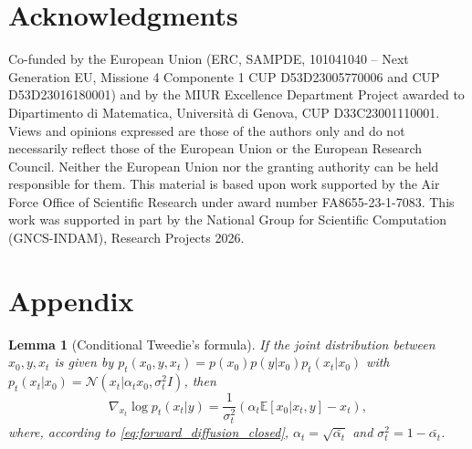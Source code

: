 \documentclass[a4paper,11pt]{article}
\theoremstyle{definition}
\theoremstyle{plain}
\newtheorem{lemma}{Lemma}
\theoremstyle{remark}
\begin{document}
\section*{Acknowledgments}
Co-funded by the European Union (ERC, SAMPDE, 101041040 – Next Generation EU, Missione 4 Componente 1 CUP D53D23005770006 and CUP D53D23016180001) and by the MIUR Excellence Department Project awarded to Dipartimento di Matematica, Università di Genova, CUP D33C23001110001. Views and opinions expressed are  those of the authors only and do not necessarily reflect those of the European Union or the European Research Council. Neither the European Union nor the granting authority can be held responsible for them. This material is based upon work supported by the Air Force Office of Scientific Research under award number FA8655-23-1-7083.
This work was supported in part by the National Group for Scientific Computation (GNCS-INDAM), Research Projects 2026.

\appendix

\section{Appendix}
\label{appendix}
	\begin{lemma}[Conditional Tweedie's formula]
		If the joint distribution between $x_0, y, x_t$ is given by $p_t(x_0, y, x_t) = p(x_0)p(y|x_0)p_t(x_t|x_0)$ with $p_t(x_t|x_0) = \mathcal{N}(x_t| \alpha_t x_0,  \sigma_t^2 I)$, then 
		\begin{equation}
			\nabla_{x_t} \log p_t(x_t|y) = \frac{1}{ \sigma_t^2}(\alpha_t \mathbb{E}[x_0|x_t, y] - x_t),
		\end{equation}
		where, according to \eqref{eq:forward_diffusion_closed},	$\alpha_t = \sqrt{\bar{\alpha_t}}$ and
		$\sigma_t^2 = 1-{\bar{\alpha_t}}$.
	\end{lemma}
\end{document}
